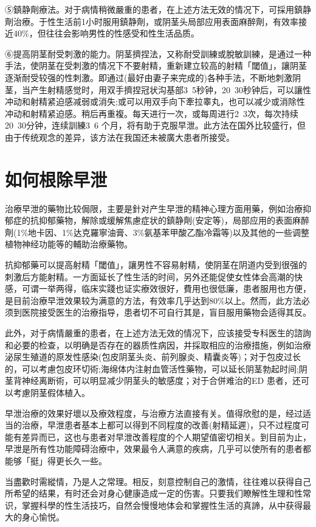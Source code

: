 \documentclass[12pt,UTF8]{ctexbook}
\begin{document}
⑤鎮静劑療法。对于病情稍微嚴重的患者，在上述方法无效的情况下，可採用鎮静劑治療。于性生活前1小时服用鎮静劑，或阴茎头局部应用表面麻醉劑，有效率接近40\%，但往往会影响男性的性感受和性生活品质。

⑥提高阴茎耐受刺激的能力。阴茎擠捏法，又称耐受訓練或脫敏訓練，是通过一种手法，使阴茎在受刺激的情况下不要射精，重新建立较高的射精「閾值」，讓阴茎逐渐耐受较强的性刺激。即通过(最好由妻子来完成的)各种手法，不断地刺激阴茎，当产生射精感觉时，用双手擠捏冠状沟基部3~5秒钟，20~30秒钟后，可以讓性冲动和射精紧迫感减弱或消失;或可以用双手向下牽拉睾丸，也可以减少或消除性冲动和射精紧迫感。稍后再重複。每天进行一次，或每周进行2~3次，每次持续20~30分钟，连续訓練3~6 个月，将有助于克服早泄。此方法在国外比较盛行，但由于传统观念的差异，该方法在我国还未被廣大患者所接受。

\section{如何根除早泄}

治療早泄的藥物比较侷限，主要是針对产生早泄的精神心理方面用藥，例如治療抑郁症的抗抑郁藥物，解除或缓解焦慮症状的鎮静劑(安定等)，局部应用的表面麻醉劑(1\%地卡因、1\%达克羅寧油膏、3\%氨基苯甲酸乙酯冷霜等)以及其他的一些调整植物神经功能等的輔助治療藥物。

抗抑郁藥可以提高射精「閾值」，讓男性不容易射精，使阴茎在阴道内受到很强的刺激后方能射精。一方面延长了性生活的时间，另外还能促使女性体会高潮的快感，可谓一举两得，临床实踐也证实療效很好，費用也很低廉，患者服用也方便，是目前治療早泄效果较为满意的方法，有效率几乎达到80\%以上。然而，此方法必须到医院接受医生的治療指导，患者切不可自行其是，盲目服用藥物会适得其反。

此外，对于病情嚴重的患者，在上述方法无效的情况下，应该接受专科医生的諮詢和必要的检查，以明确是否存在的器质性病因，并採取相应的治療措施，例如治療泌尿生殖道的原发性感染(包皮阴茎头炎、前列腺炎、精囊炎等)；对于包皮过长的，可以考慮包皮环切術;海绵体内注射血管活性藥物，可以延长阴茎勃起时间;阴茎背神经离断術，可以明显减少阴茎头的敏感度；对于合併难治的ED 患者，还可以考慮阴茎假体植入。

早泄治療的效果好壞以及療效程度，与治療方法直接有关。值得欣慰的是，经过适当的治療，早泄患者基本上都可以得到不同程度的改善(射精延遲)，只不过程度可能有差异而已，这也与患者对早泄改善程度的个人期望值密切相关。到目前为止，早泄是所有性功能障碍治療中，效果最令人满意的疾病，几乎可以使所有的患者都能够「挺」得更长久一些。

当盡歡时需縱情，乃是人之常理。相反，刻意控制自己的激情，往往难以获得自己所希望的结果，有时还会对身心健康造成一定的伤害。只要我们瞭解性生理和性常识，掌握科學的性生活技巧，自然会慢慢地体会和掌握性生活的真諦，从中获得最大的身心愉悦。
\end{document}
